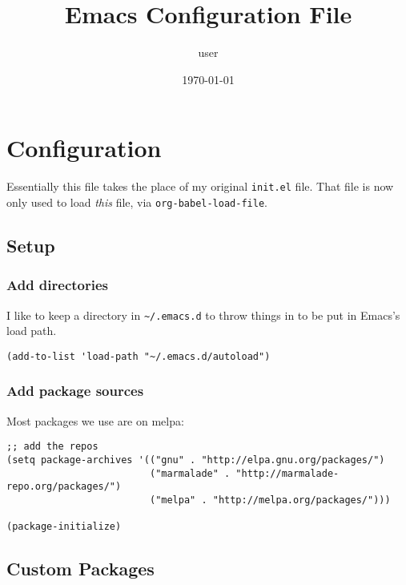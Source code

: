 \documentclass[11pt]{article}
\author{user}
\date{\today}
\title{Emacs Configuration File}
\begin{document}
\maketitle
\tableofcontents


\section{Configuration}
\label{sec-1}

Essentially this file takes the place of my original \texttt{init.el} file. That file is now only
used to load \emph{this} file, via \texttt{org-babel-load-file}.

\subsection{Setup}
\label{sec-1-1}
\subsubsection{Add directories}
\label{sec-1-1-1}

I like to keep a directory in \texttt{\textasciitilde{}/.emacs.d} to throw things in to be put in Emacs's load path.

\begin{verbatim}
(add-to-list 'load-path "~/.emacs.d/autoload")
\end{verbatim}

\subsubsection{Add package sources}
\label{sec-1-1-2}

Most packages we use are on melpa:

\begin{verbatim}
;; add the repos
(setq package-archives '(("gnu" . "http://elpa.gnu.org/packages/")
                         ("marmalade" . "http://marmalade-repo.org/packages/")
                         ("melpa" . "http://melpa.org/packages/")))

(package-initialize)
\end{verbatim}

\subsection{Custom Packages}
\label{sec-1-2}
\end{document}
